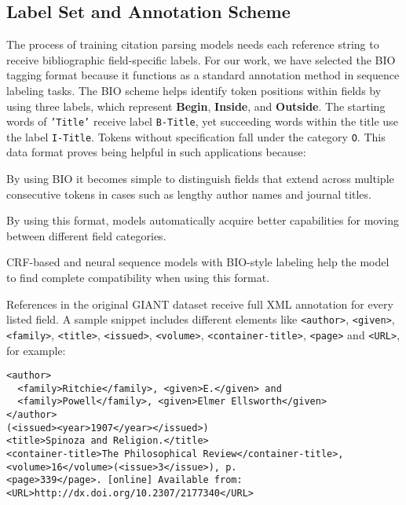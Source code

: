 \subsection{Label Set and Annotation Scheme}
The process of training citation parsing models needs each reference string to receive bibliographic field-specific labels. For our work, we have selected the BIO tagging format because it functions as a standard annotation method in sequence labeling tasks. The BIO scheme helps identify token positions within fields by using three labels, which represent  \textbf{Begin}, \textbf{Inside}, and  \textbf{Outside}. The starting words of \texttt{'Title'} receive label \texttt{B-Title}, yet succeeding words within the title use the label \texttt{I-Title}. Tokens without specification fall under the category \texttt{O}.
This data format proves being helpful in such applications because:
\begin{compactitem}
\item By using BIO it becomes simple to distinguish fields that extend across multiple consecutive tokens in cases such as lengthy author names and journal titles.
\item By using this format, models automatically acquire better capabilities for moving between different field categories.
\item CRF-based and neural sequence models with BIO-style labeling help the model to find complete compatibility when using this format.
\end{compactitem}

References in the original GIANT dataset receive full XML annotation for every listed field. A sample snippet includes different elements like \texttt{<author>}, \texttt{<given>}, \texttt{<family>}, \texttt{<title>}, \texttt{<issued>}, \texttt{<volume>}, \texttt{<container-title>}, \texttt{<page>} and \texttt{<URL>}, for example:
\begin{verbatim}
<author>
  <family>Ritchie</family>, <given>E.</given> and
  <family>Powell</family>, <given>Elmer Ellsworth</given>
</author>
(<issued><year>1907</year></issued>)
<title>Spinoza and Religion.</title>
<container-title>The Philosophical Review</container-title>,
<volume>16</volume>(<issue>3</issue>), p.
<page>339</page>. [online] Available from:
<URL>http://dx.doi.org/10.2307/2177340</URL>
\end{verbatim}

